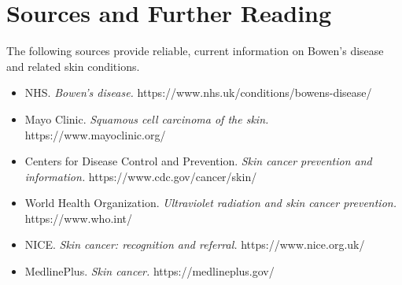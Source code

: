 \section*{Sources and Further Reading}
The following sources provide reliable, current information on Bowen's disease and related skin conditions.
\begin{itemize}
    \item NHS. \textit{Bowen's disease.} https://www.nhs.uk/conditions/bowens-disease/
    \item Mayo Clinic. \textit{Squamous cell carcinoma of the skin.} https://www.mayoclinic.org/
    \item Centers for Disease Control and Prevention. \textit{Skin cancer prevention and information.} https://www.cdc.gov/cancer/skin/
    \item World Health Organization. \textit{Ultraviolet radiation and skin cancer prevention.} https://www.who.int/
    \item NICE. \textit{Skin cancer: recognition and referral.} https://www.nice.org.uk/
    \item MedlinePlus. \textit{Skin cancer.} https://medlineplus.gov/
\end{itemize}
